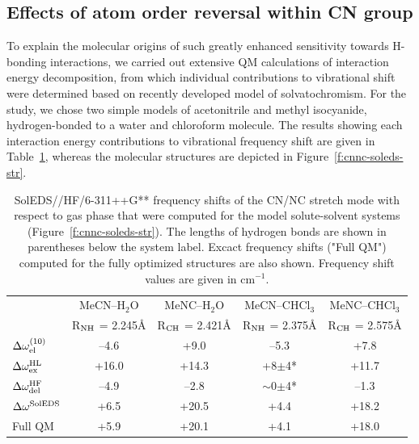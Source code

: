 \documentclass[a4paper,titlepage,twoside,fleqn,12pt]{book}
\begin{document}
\begin{refsection}
\section{Effects of atom order reversal within CN group}

To explain the molecular origins of such greatly enhanced sensitivity towards H-bonding 
interactions, we carried out extensive QM calculations of interaction energy decomposition, 
from which individual contributions to vibrational shift were determined based on recently 
developed model of solvatochromism. For the study, we chose two simple models of 
acetonitrile and methyl isocyanide, hydrogen\hyp{}bonded to a water and chloroform molecule. 
The results showing each interaction energy contributions to vibrational frequency shift are 
given in Table~\ref{t:cnnc-soleds}, whereas the molecular structures are depicted in Figure~\ref{f:cnnc-soleds-str}.
%
\begin{table}[t!]
\caption{SolEDS//HF/6-311++G** frequency shifts of the CN/NC stretch mode with
respect to gas phase that were computed for the model solute\hyp{}solvent systems 
(Figure~\ref{f:cnnc-soleds-str}). The 
lengths of hydrogen bonds are shown in parentheses below the system label.
Excact frequency shifts ("Full QM") computed for the fully 
optimized structures are also shown.
Frequency shift values are given in cm$^{-1}$.
\label{t:cnnc-soleds}}
\begin{tabular*}{1.0\textwidth}{@{\extracolsep{\fill} } l cccc}
\hline\hline
              & MeCN--H$_2$O & MeNC--H$_2$O & MeCN--CHCl$_3$ & MeNC--CHCl$_3$ \\
              & R$_{\rm NH}$ = 2.245\AA 
              & R$_{\rm CH}$ = 2.421\AA 
              & R$_{\rm NH}$ = 2.375\AA 
              & R$_{\rm CH}$ = 2.575\AA \\
\hline
$\Delta\omega^{(10)}_{\rm el}$       & --4.6   &  +9.0    &  --5.3         &  +7.8  \\
$\Delta\omega^{\rm HL}_{\rm ex}$     & +16.0   & +14.3    & +8$\pm$4*      & +11.7  \\
$\Delta\omega^{\rm HF}_{\rm del}$    & --4.9   & --2.8    & $\sim$0$\pm$4* & --1.3  \\
$\Delta\omega^{\rm SolEDS}$          &  +6.5   & +20.5    &   +4.4         & +18.2  \\
\hline
Full QM                              &  +5.9   & +20.1    &   +4.1         & +18.0  \\
\hline\hline
\end{tabular*}
\end{table}

\end{refsection}
\end{document}
